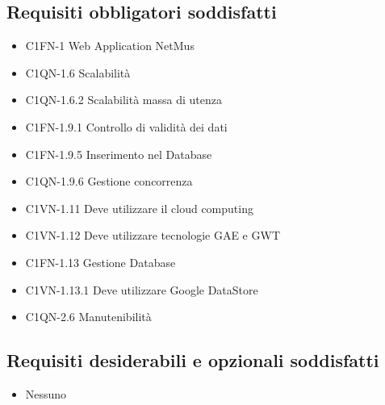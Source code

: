\subsection*{Requisiti obbligatori soddisfatti}
\begin{itemize}
    \item C1FN-1 Web Application NetMus
    \item C1QN-1.6 Scalabilit\`a
    \item C1QN-1.6.2 Scalabilit\`a massa di utenza
    \item C1FN-1.9.1 Controllo di validit\`a dei dati
	\item C1FN-1.9.5 Inserimento nel Database
	\item C1QN-1.9.6 Gestione concorrenza
	\item C1VN-1.11 Deve utilizzare il cloud computing
	\item C1VN-1.12 Deve utilizzare tecnologie GAE e GWT
	\item C1FN-1.13 Gestione Database
	\item C1VN-1.13.1 Deve utilizzare Google DataStore
	\item C1QN-2.6 Manutenibilit\`a
\end{itemize}
\subsection*{Requisiti desiderabili e opzionali soddisfatti}
\begin{itemize}
    \item Nessuno
\end{itemize}
